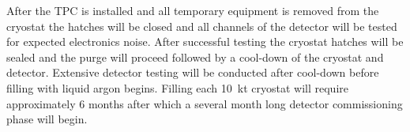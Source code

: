 After the TPC is installed and all temporary equipment is removed from
the cryostat the hatches will be closed and all channels of the
detector will be tested for expected electronics noise. After
successful testing the cryostat hatches will be sealed and the purge
will proceed followed by a cool-down of the cryostat and detector.
Extensive detector testing will be conducted after cool-down before
filling with liquid argon begins. Filling each 10~kt cryostat will
require approximately 6 months after which a several month long
detector commissioning phase will begin.

